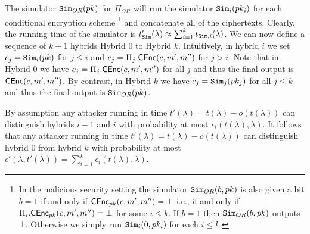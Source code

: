 \begin{remindertheorem}{}\thmORPrivacy
\end{remindertheorem}
\begin{proofof}{}
    The simulator ${\mathtt{Sim}}_{OR}(pk)$ for $\Pi_{OR}$ will run the simulator ${\mathtt{Sim}}_i(pk_i)$ for each conditional encryption scheme \footnote{In the malicious security setting the simulator ${\mathtt{Sim}}_{OR}(b, pk)$ is also given a bit $b=1$ if and only if ${\mathsf{C}}{\mathsf{Enc}}_{pk}(c,m',m'')=\bot$ i.e., if and only if $\Pi_i.{\mathsf{C}}{\mathsf{Enc}}_{pk}(c,m',m'')=\bot$ for some $i \leq k$. If $b=1$ then ${\mathtt{Sim}}_{OR}(b,pk)$ outputs $\bot$. Otherwise we simply run ${\mathtt{Sim}}_i(0,pk_i)$ for each $i \leq k$.} and concatenate all of the ciphertexts. Clearly, the running time of the simulator is $t_{{\mathtt{Sim}}}'(\lambda) \approx \sum_{i=1}^k t_{{\mathtt{Sim}},i}(\lambda)$. We can now define a sequence of $k+1$ hybrids Hybrid $0$ to Hybrid $k$. Intuitively, in hybrid $i$ we set $c_j = {\mathtt{Sim}}_i(pk)$ for $j\leq i$ and $c_j = \Pi_j.{\mathsf{C}}{\mathsf{Enc}}(c,m',m'')$ for $j > i$. Note that in Hybrid $0$ we have $c_j = \Pi_j.{\mathsf{C}}{\mathsf{Enc}}(c,m',m'')$ for all $j$ and thus the final output is ${\mathsf{C}}{\mathsf{Enc}}(c,m',m'')$. By contrast, in Hybrid $k$ we have   $c_j = {\mathtt{Sim}}_j(pk_j)$ for all $j \leq k$ and thus the final output is ${\mathtt{Sim}}_{OR}(pk)$. 
        
    By assumption any attacker running in time $t'(\lambda)=t(\lambda) - o(t(\lambda))$ can distinguish hybrids $i-1$ and $i$ with probability at most $\epsilon_i(t(\lambda), \lambda)$. It follows that any attacker running in time $t'(\lambda)=t(\lambda)  - o(t(\lambda))$ can  distinguish hybrid $0$ from hybrid $k$ with probability at most  $\epsilon'(\lambda,t'(\lambda)) = \sum_{i=1}^k  \epsilon_i(t(\lambda), \lambda)$. 
\end{proofof}

